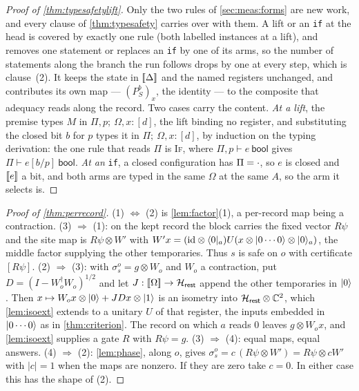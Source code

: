 \documentclass[acmsmall,screen,review,anonymous,nonacm]{acmart}
\begin{document}
\begin{proof}[Proof of \cref{thm:typesafetylift}]
Only the two rules of \cref{sec:meas:forms} are new work, and every clause
of \cref{thm:typesafety} carries over with them. A lift or an \texttt{if} at
the head is covered by exactly one rule (both labelled instances at a lift),
and removes one statement or replaces an \texttt{if} by one of its arms, so the
number of statements along the branch the run follows drops by one at every step,
which is clause~(2). It
keeps the state in $[\![\Delta]\!]$ and the named registers unchanged, and
contributes its own map --- $(P^{b}_S)_x$, the identity --- to the composite
that adequacy reads along the record. Two cases carry the content. \emph{At
a lift}, the premise types $M$ in $\Pi, p;\ \Omega, x{:}[d]$, the lift
binding no register, and substituting the closed bit $b$ for $p$ types it in
$\Pi;\ \Omega, x{:}[d]$, by induction on the typing derivation: the one rule
that reads $\Pi$ is \textsc{If}, where $\Pi, p \vdash e\ \mathsf{bool}$ gives
$\Pi \vdash e[b/p]\ \mathsf{bool}$. \emph{At an} \texttt{if}, a closed
configuration has $\Pi = \cdot$, so $e$ is closed and $[\![e]\!]$ a bit,
and both arms are typed in the same $\Omega$ at the same $A$, so the arm it
selects is.\qedhere
\end{proof}

\begin{proof}[Proof of \cref{thm:perrecord}]
(1) $\Leftrightarrow$ (2) is \cref{lem:factor}(1), a per-record map being a
contraction. (3) $\Rightarrow$ (1): on the kept record the block carries
the fixed vector $R\psi$ and the site map is $R\psi \otimes W'$ with
$W'x=(\mathrm{id}\otimes\langle 0 \rvert_a)U(x\otimes\lvert 0\cdots0 \rangle\otimes\lvert 0 \rangle_a)$,
the middle factor supplying the other temporaries. Thus $s$ is safe
on $o$ with certificate $[R\psi]$. (2) $\Rightarrow$ (3): with
$\sigma^{o}_s = g \otimes W_o$ and $W_o$ a contraction, put
$D = (I - W_o^{\dagger}W_o)^{1/2}$ and let
$J:[\![\Omega]\!]\to\mathcal{H}_{\mathsf{rest}}$ append the other temporaries in $\lvert 0 \rangle$.
Then $x \mapsto W_o x \otimes \lvert 0 \rangle + JDx \otimes \lvert 1 \rangle$ is an isometry into
$\mathcal{H}_{\mathsf{rest}} \otimes \mathbb{C}^{2}$, which \cref{lem:isoext} extends to a unitary $U$
of that register, the inputs embedded in $\lvert 0\cdots0 \rangle$ as in
\cref{thm:criterion}. The record on which $a$ reads $0$ leaves
$g \otimes W_o x$, and \cref{lem:isoext} supplies a gate $R$ with
$R\psi = g$. (3) $\Rightarrow$ (4): equal maps, equal answers. (4) $\Rightarrow$ (2):
\cref{lem:phase}, along $o$, gives $\sigma^{o}_s = c\,(R\psi
\otimes W') = R\psi \otimes cW'$ with $|c|=1$ when the maps are nonzero. If they are zero take $c=0$.
In either case this has the shape of (2).
\end{proof}
\end{document}
